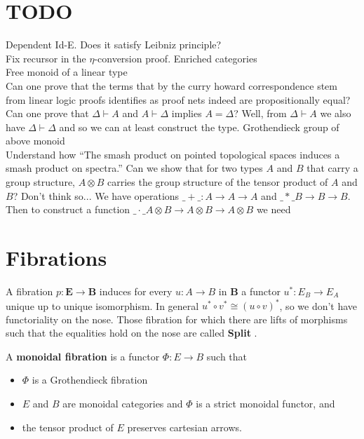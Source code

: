 \section{TODO}
Dependent Id-E. Does it satisfy Leibniz principle?\\
Fix recursor in the $\eta$-conversion proof.
Enriched categories\\
Free monoid of a linear type\\
Can one prove that the terms that by the curry howard correspondence stem from linear logic proofs identifies as proof nets indeed are propositionally equal?\\
Can one prove that $\Delta \vdash A$ and $A \vdash \Delta$ implies $A = \Delta$?
Well, from $\Delta \vdash A$ we also have $\Delta \vdash \Delta$ and so we can at least construct the type. 
Grothendieck group of above monoid\\
Understand how ``The smash product on pointed topological spaces induces a smash product on spectra.''
Can we show that for two types $A$ and $B$ that carry a group structure, $A \otimes B$ carries the group structure of the tensor product of $A$ and $B$? Don't think so... We have operations $\_+\_ : A \to A \to A$ and $\_*\_ B \to B \to B$. Then to construct a function $\_\cdot\_ A \otimes B \to A \otimes B \to A \otimes B$ we need
\newpage
\section{Fibrations}
A fibration $p : \mathbf{E} \to \mathbf{B}$ induces for every $u : A \to B$ in $\mathbf{B}$ a functor $u^*: E_B \to E_A$ unique up to unique isomorphism. In general $u^* \circ v^* \cong (u \circ v)^*$, so we don't have functoriality on the nose. Those fibration for which there are lifts of morphisms such that the equalities hold on the nose are called \textbf{Split }.
\begin{defn}
A \textbf{monoidal fibration} is a functor $\Phi\colon E\to B$ such that
\begin{itemize}
\item $\Phi$ is a Grothendieck fibration
\item $E$ and $B$ are monoidal categories and $\Phi$ is a strict monoidal functor, and
\item the tensor product of $E$ preserves cartesian arrows.
\end{itemize}
\end{defn}
